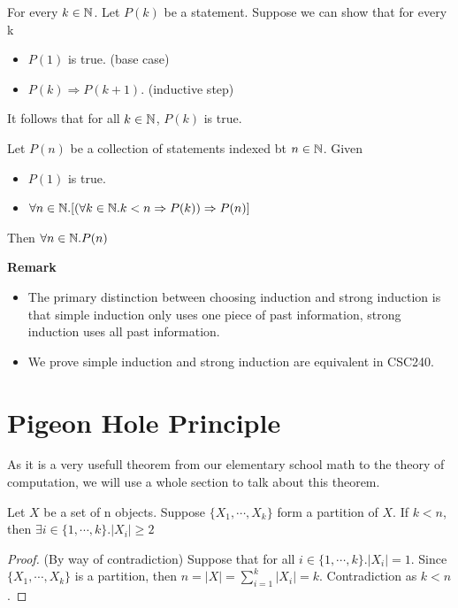 \begin{theorem}
    For every $k \in \mathbb{N}$. Let $P(k)$ be a statement. Suppose we can show that for every k
    \begin{itemize}
        \item $P(1)$ is true. (base case)
        \item $P(k) \Rightarrow P(k+1)$. (inductive step)
    \end{itemize}
    It follows that for all $k \in \mathbb{N}$, $P(k)$ is true.
\end{theorem}

\begin{theorem}
    Let $P(n)$ be a collection of statements indexed bt $n \in \mathbb{N}$. Given
    \begin{itemize}
        \item $P(1)$ is true.
        \item $\forall n \in \mathbb{N}.[(\forall k \in \mathbb{N}. k<n \Rightarrow P(k)) \Rightarrow P(n)]$
    \end{itemize}
    Then $\forall n \in \mathbb{N}. P(n)$
\end{theorem}
\textbf{Remark}
\begin{itemize}
    \item The primary distinction between choosing induction and strong induction is that simple induction only uses one piece of past information, strong induction uses all past information.
    \item We prove simple induction and strong induction are equivalent in CSC240.
\end{itemize}


\section{Pigeon Hole Principle}
As it is a very usefull theorem from our elementary school math to the theory of computation, 
we will use a whole section to talk about this theorem.\\
\begin{theorem}
    Let $X$ be a set of n objects. 
    Suppose $\{X_1, \cdots ,X_k\}$ form a partition of $X$. 
    If $k<n$, then $\exists i \in \{1, \cdots ,k\}. |X_i| \geq 2$
\end{theorem}
\begin{proof}
    (By way of contradiction)
    Suppose that for all $i \in \{1, \cdots ,k\}. |X_i|=1$. 
    Since $\{X_1, \cdots ,X_k\}$ is a partition, then $n=|X|=\sum_{i=1}^k|X_i|=k$. Contradiction as $k<n$.
\end{proof}

